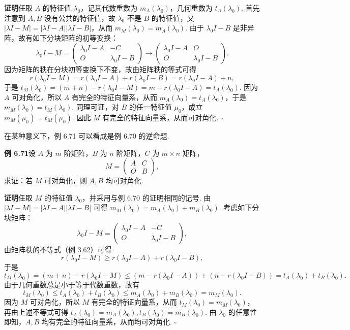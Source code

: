 \documentclass[UTF8,12pt,a4paper,fontset=fandol]{ctexart}
\begin{document}
\noindent\textbf{证明}\quad 任取 $A$ 的特征值 $\lambda_0$，记其代数重数为 $m_A(\lambda_0)$，几何重数为 $t_A(\lambda_0)$. 首先注意到 $A,B$ 没有公共的特征值，故 $\lambda_0$ 不是 $B$ 的特征值，又 $|\lambda I-M|=|\lambda I-A||\lambda I-B|$，从而 $m_M(\lambda_0)=m_A(\lambda_0)$. 由于 $\lambda_0I-B$ 是非异阵，故有如下分块矩阵的初等变换：
\[
\lambda_0I-M
=\left(\begin{array}{cc}
\lambda_0I-A & -C\\
O & \lambda_0I-B
\end{array}\right)
\longrightarrow
\left(\begin{array}{cc}
\lambda_0I-A & O\\
O & \lambda_0I-B
\end{array}\right).
\]
因为矩阵的秩在分块初等变换下不变，故由矩阵秩的等式可得
\[
r(\lambda_0I-M)=r(\lambda_0I-A)+r(\lambda_0I-B)=r(\lambda_0I-A)+n,
\]
于是 $t_M(\lambda_0)=(m+n)-r(\lambda_0I-M)=m-r(\lambda_0I-A)=t_A(\lambda_0)$. 因为 $A$ 可对角化，所以 $A$ 有完全的特征向量系，从而 $m_A(\lambda_0)=t_A(\lambda_0)$，于是 $m_M(\lambda_0)=t_M(\lambda_0)$. 同理可证，对 $B$ 的任一特征值 $\mu_0$，成立 $m_M(\mu_0)=t_M(\mu_0)$. 因此 $M$ 有完全的特征向量系，从而可对角化. $\square$

在某种意义下，例 6.71 可以看成是例 6.70 的逆命题.

\noindent\textbf{例 6.71}\quad 设 $A$ 为 $m$ 阶矩阵，$B$ 为 $n$ 阶矩阵，$C$ 为 $m\times n$ 矩阵，
\[
M=\left(\begin{array}{cc}
A & C\\
O & B
\end{array}\right),
\]
求证：若 $M$ 可对角化，则 $A,B$ 均可对角化.

\noindent\textbf{证明}\quad 任取 $M$ 的特征值 $\lambda_0$，并采用与例 6.70 的证明相同的记号. 由 $|\lambda I-M|=|\lambda I-A||\lambda I-B|$ 可得 $m_M(\lambda_0)=m_A(\lambda_0)+m_B(\lambda_0)$. 考虑如下分块矩阵：
\[
\lambda_0I-M=\left(\begin{array}{cc}
\lambda_0I-A & -C\\
O & \lambda_0I-B
\end{array}\right),
\]
由矩阵秩的不等式（例 3.62）可得
\[
r(\lambda_0I-M)\ge r(\lambda_0I-A)+r(\lambda_0I-B),
\]
于是
\[
t_M(\lambda_0)=(m+n)-r(\lambda_0I-M)
\le (m-r(\lambda_0I-A))+(n-r(\lambda_0I-B))
=t_A(\lambda_0)+t_B(\lambda_0).
\]
由于几何重数总是小于等于代数重数，故有
\[
t_M(\lambda_0)\le t_A(\lambda_0)+t_B(\lambda_0)\le m_A(\lambda_0)+m_B(\lambda_0)=m_M(\lambda_0).
\]
因为 $M$ 可对角化，所以 $M$ 有完全的特征向量系，从而 $t_M(\lambda_0)=m_M(\lambda_0)$，再由上述不等式可得 $t_A(\lambda_0)=m_A(\lambda_0),t_B(\lambda_0)=m_B(\lambda_0)$. 由 $\lambda_0$ 的任意性即知，$A,B$ 均有完全的特征向量系，从而均可对角化. $\square$
\end{document}
